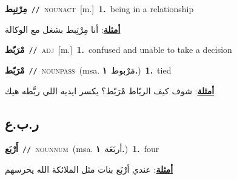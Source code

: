 \documentclass[10pt,a4paper,twoside]{article} %
\begin{document}
\begin{multicols}{2}
{\setlength\topsep{0pt}\textbf{\foreignlanguage{arabic}{مِرْتِبِط}}\ {\color{gray}\texttt{//}\color{black}}\ \textsc{noun\textunderscore act}\ [m.]\ \textbf{1.}~being in a relationship\  \begin{flushright}\color{gray}\foreignlanguage{arabic}{\textbf{\underline{\foreignlanguage{arabic}{أمثلة}}}: أنا مِرْتِبط بشغل مع الوكالة}\end{flushright}\color{black}} \vspace{2mm}

{\setlength\topsep{0pt}\textbf{\foreignlanguage{arabic}{مْرَبّط}}\ {\color{gray}\texttt{//}\color{black}}\ \textsc{adj}\ [m.]\ \textbf{1.}~confused and unable to take a decision\ } \vspace{2mm}

{\setlength\topsep{0pt}\textbf{\foreignlanguage{arabic}{مْرَبّط}}\ {\color{gray}\texttt{//}\color{black}}\ \textsc{noun\textunderscore pass}\ \color{gray}(msa. \foreignlanguage{arabic}{مَرْبوط}~\foreignlanguage{arabic}{\textbf{١.}})\color{black}\ \textbf{1.}~tied\  \begin{flushright}\color{gray}\foreignlanguage{arabic}{\textbf{\underline{\foreignlanguage{arabic}{أمثلة}}}: شوف كيف الربّاط مْرَبّط؟ يكسر ايديه اللي ربَّطه هيك}\end{flushright}\color{black}} \vspace{2mm}

\vspace{-3mm}
\subsection*{\color{blue}\foreignlanguage{arabic}{ر.ب.ع}\color{blue}{}} 

{\setlength\topsep{0pt}\textbf{\foreignlanguage{arabic}{أَرْبَع}}\ {\color{gray}\texttt{//}\color{black}}\ \textsc{noun\textunderscore num}\ \color{gray}(msa. \foreignlanguage{arabic}{أربَعَة}~\foreignlanguage{arabic}{\textbf{١.}})\color{black}\ \textbf{1.}~four\  \begin{flushright}\color{gray}\foreignlanguage{arabic}{\textbf{\underline{\foreignlanguage{arabic}{أمثلة}}}: عندي أرْبَع بنات مثل الملائكة الله يحرسهم}\end{flushright}\color{black}} \vspace{2mm}


\end{multicols}
\end{document}
